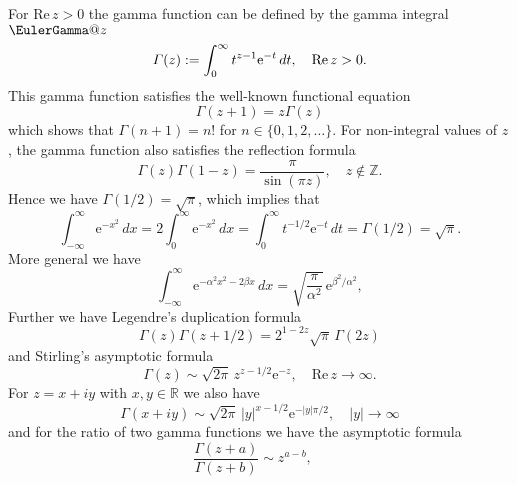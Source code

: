 \documentclass[envcountchap,graybox]{svmono}
\newcommand{\e}{\textrm{e}}
\renewcommand{\Gamma}{\varGamma}
\begin{document}
For $\textrm{Re}\,z>0$ the gamma function can be defined by the
gamma integral $\EulerGamma@{z}$
\begin{equation}
\label{DefGamma}\index{Gamma function}
\Gamma(z):=\int_0^{\infty}t^{z-1}\e^{-t}\,dt,\quad\textrm{Re}\,z>0.
\end{equation}
This gamma function satisfies the well-known functional equation
\begin{equation}
\label{GammaFunctional}
\Gamma(z+1)=z\Gamma(z)
\end{equation}
which shows that $\Gamma(n+1)=n!$ for $n\in\{0,1,2,\ldots\}$.
For non-integral values of $z$, the gamma function also satisfies the reflection formula
\begin{equation}
\label{GammaReflection}
\Gamma(z)\Gamma(1-z)=\frac{\pi}{\sin(\pi z)},\quad z\notin\mathbb{Z}.
\end{equation}
Hence we have $\Gamma(1/2)=\sqrt{\pi}$, which implies that
\begin{equation}
\label{IntExp}
\int_{-\infty}^{\infty}\e^{-x^2}\,dx=2\int_0^{\infty}\e^{-x^2}\,dx
=\int_0^{\infty}t^{-1/2}\e^{-t}\,dt=\Gamma(1/2)=\sqrt{\pi}.
\end{equation}
More general we have
\begin{equation}
\label{IntHermite}
\int_{-\infty}^{\infty}\e^{-\alpha^2x^2-2\beta x}\,dx
=\sqrt{\frac{\pi}{\alpha^2}}\,\e^{\beta^2/\alpha^2},
\end{equation}
Further we have Legendre's duplication formula
\begin{equation}
\label{GammaDuplication}
\Gamma(z)\Gamma(z+1/2)=2^{1-2z}\sqrt{\pi}\,\Gamma(2z)
\end{equation}
and Stirling's asymptotic formula
\begin{equation}
\label{GammaAsymptotic}
\Gamma(z)\sim\sqrt{2\pi}\,z^{z-1/2}\e^{-z},\quad\textrm{Re}\,z\rightarrow\infty.
\end{equation}
For $z=x+iy$ with $x,y\in\mathbb{R}$ we also have
\begin{equation}
\label{GammaAsymptotic2}
\Gamma(x+iy)\sim\sqrt{2\pi}\,|y|^{x-1/2}\e^{-|y|\pi/2},\quad|y|\rightarrow\infty
\end{equation}
and for the ratio of two gamma functions we have the asymptotic
formula
\begin{equation}
\label{GammaAsymptotic3}
\frac{\Gamma(z+a)}{\Gamma(z+b)}\sim z^{a-b},\quad
\end{equation}
\end{document}
